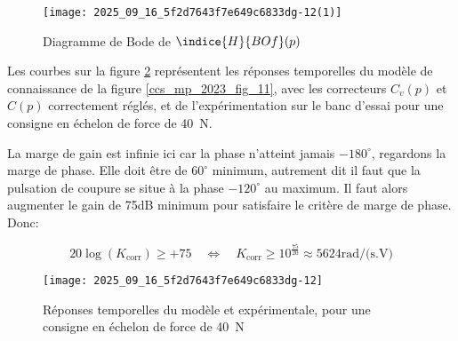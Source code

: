 \begin{figure}[!h]
\centering
\texttt{[image: 2025\_09\_16\_5f2d7643f7e649c6833dg-12(1)]}
\caption{\label{ccs_mp_2023_fig_16}  Diagramme de Bode de $\indice{H}{BO f}(p)$}
\end{figure}

\fi

Les courbes sur la figure \ref{ccs_mp_2023_fig_17} représentent les réponses temporelles du modèle de connaissance de la figure \ref{ccs_mp_2023_fig_11}, avec les correcteurs $C_{v}(p)$ et $C(p)$ correctement réglés, et de l'expérimentation sur le banc d'essai pour une consigne en échelon de force de \SI{40}{N}.

\ifprof
\begin{corrige}
La marge de gain est infinie ici car la phase n'atteint jamais $-180^\circ$, regardons la marge de phase. Elle doit être de $60^\circ$ minimum, autrement dit il faut que la pulsation de coupure se situe à la phase $-120^\circ$ au maximum. Il faut alors augmenter le gain de 75dB minimum pour satisfaire le critère de marge de phase. Donc:

$$ 20\log(K_{\text{corr}}) \geq + 75 \quad \Leftrightarrow \quad  \boxed{K_{\text{corr}} \geq 10^{\frac{75}{20}} \approx 5624 \text{rad/(s.V)}}$$
\end{corrige}
\else
\fi




\ifprof
\else


\begin{figure}[!h]
\centering
\texttt{[image: 2025\_09\_16\_5f2d7643f7e649c6833dg-12]}
\caption{\label{ccs_mp_2023_fig_17} Réponses temporelles du modèle et expérimentale, pour une consigne en échelon de force de \SI{40}{N}}
\end{figure}

